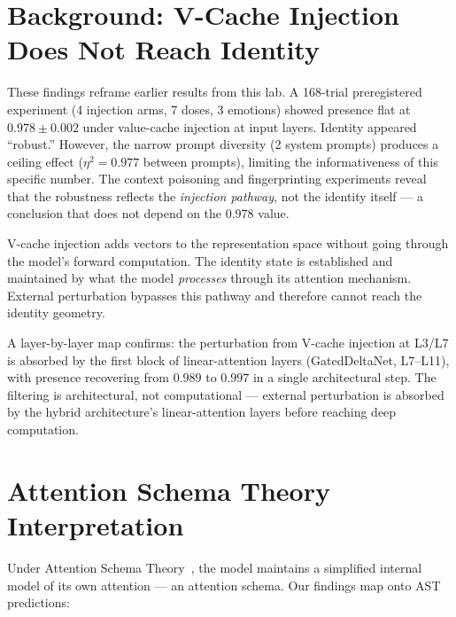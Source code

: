\documentclass[11pt,a4paper]{article}
\begin{document}
\section{Background: V-Cache Injection Does Not Reach Identity}
\label{sec:vcache}

These findings reframe earlier results from this lab. A 168-trial
preregistered experiment (4 injection arms, 7 doses, 3 emotions) showed
presence flat at $0.978 \pm 0.002$ under value-cache injection at input
layers. Identity appeared ``robust.'' However, the narrow prompt
diversity (2 system prompts) produces a ceiling effect ($\eta^2 = 0.977$
between prompts), limiting the informativeness of this specific number.
The context poisoning and fingerprinting experiments reveal that the
robustness reflects the \emph{injection pathway}, not the identity
itself --- a conclusion that does not depend on the 0.978 value.

V-cache injection adds vectors to the representation space without going
through the model's forward computation. The identity state is established
and maintained by what the model \emph{processes} through its attention
mechanism. External perturbation bypasses this pathway and therefore
cannot reach the identity geometry.

A layer-by-layer map confirms: the perturbation from V-cache injection at
L3/L7 is absorbed by the first block of linear-attention layers
(GatedDeltaNet, L7--L11), with presence recovering from $0.989$ to $0.997$
in a single architectural step. The filtering is architectural, not
computational --- external perturbation is absorbed by the hybrid
architecture's linear-attention layers before reaching deep computation.

\section{Attention Schema Theory Interpretation}
\label{sec:ast}

Under Attention Schema Theory~\citep{graziano2015attention,
graziano2017attention}, the model maintains a simplified internal model of
its own attention --- an attention schema. Our findings map onto AST
predictions:
\end{document}

